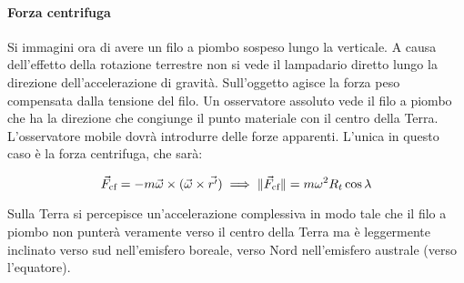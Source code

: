 \paragraph{Forza centrifuga} Si immagini ora di avere un filo a piombo sospeso lungo la verticale. A causa dell'effetto della rotazione terrestre non si vede il lampadario diretto lungo la direzione dell'accelerazione di gravità. Sull'oggetto agisce la forza peso compensata dalla tensione del filo. Un osservatore assoluto vede il filo a piombo che ha la direzione che congiunge il punto materiale con il centro della Terra. L'osservatore mobile dovrà introdurre delle forze apparenti. L'unica in questo caso è la forza centrifuga, che sarà:

\[
	\vec{F}_{\text{cf}}=-m \vec{\omega} \times (\vec{\omega} \times \vec{r'} ) \implies \lVert\vec{F}_{\text{cf}}\rVert=m\omega^2 R_t \cos\lambda
\]

Sulla Terra si percepisce un'accelerazione complessiva in modo tale che il filo a piombo non punterà veramente verso il centro della Terra ma è leggermente inclinato verso sud nell'emisfero boreale, verso Nord nell'emisfero australe (verso l'equatore).

